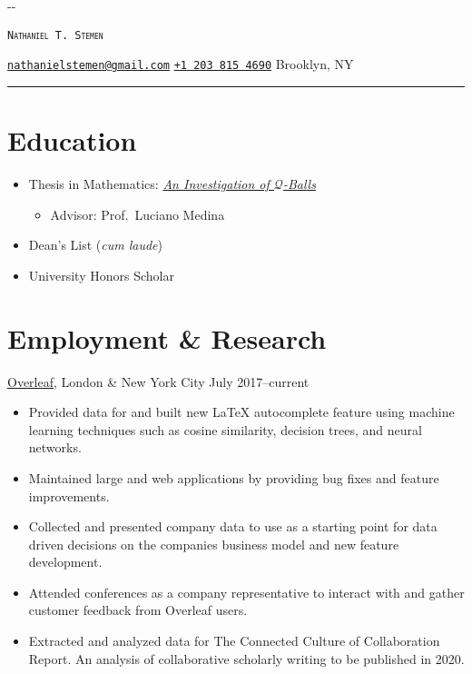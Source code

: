 \documentclass{cultvoucher}
\begin{document}
\thispagestyle{firststyle}

\begin{adjustwidth}{\dimexpr-\marginparsep-\marginparwidth}{}
\begin{center}
    {\Huge \textsc{\texttt{Nathaniel T. Stemen}}\par}
    \href{mailto:nathanielstemen@gmail.com}{\texttt{nathanielstemen@gmail.com}} \textbullet{}
    \href{tel:12038154690}{\texttt{+1\,203\,815\,4690}} \textbullet{}
    Brooklyn, NY
    \rule{\dimexpr\textwidth+\marginparsep+\marginparwidth}{0.4pt}\par
\end{center}
\end{adjustwidth}
\vspace{-15pt}

\section{Education}
\begin{itemize}
    \item Thesis in Mathematics: \href{https://github.com/natestemen/q-vortex-thesis}{\textit{An Investigation of \(\mathcal{Q}\)-Balls}}
    \begin{itemize}
          \item Advisor: Prof.\ Luciano Medina
    \end{itemize}
    \item Dean's List (\textit{cum laude})
    \item University Honors Scholar
\end{itemize}

\section{Employment \& Research}
         {\href{https://www.overleaf.com/}{Overleaf}, London \& New York City}
         {July 2017--current}
\begin{itemize}
    \item Provided data for and built new \LaTeX{} autocomplete feature using
          machine learning techniques such as cosine similarity, decision trees,
          and neural networks.
    \item Maintained large  and  web applications
          by providing bug fixes and feature improvements.
    \item Collected and presented company data to use as a starting point for
          data driven decisions on the companies business model and new feature
          development.
    \item Attended conferences as a company representative to interact with and
          gather customer feedback from Overleaf users.
    \item Extracted and analyzed data for The Connected Culture of Collaboration
          Report. An analysis of collaborative scholarly writing to be published
          in 2020.
\end{itemize}
\end{document}
